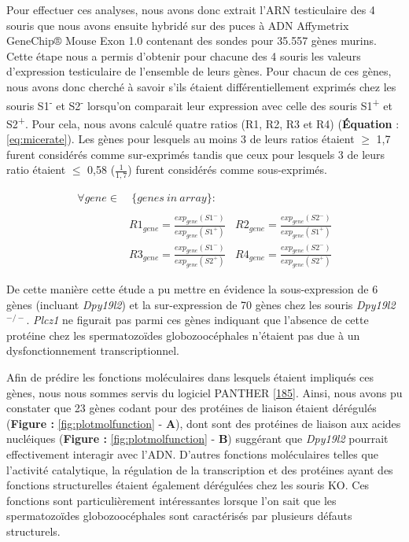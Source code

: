 \documentclass[12pt,a4paper,twoside]{ugathesis}
\theoremstyle{definition}
\theoremstyle{definition}
\theoremstyle{definition}
\theoremstyle{remark}
\begin{document}
Pour effectuer ces analyses, nous avons donc extrait l'ARN testiculaire
des 4 souris que nous avons ensuite hybridé sur des puces à ADN
Affymetrix GeneChip® Mouse Exon 1.0 contenant des sondes pour 35.557
gènes murins. Cette étape nous a permis d'obtenir pour chacune des 4
souris les valeurs d'expression testiculaire de l'ensemble de leurs
gènes. Pour chacun de ces gènes, nous avons donc cherché à savoir s'ils
étaient différentiellement exprimés chez les souris
S1\textsuperscript{-} et S2\textsuperscript{-} lorsqu'on comparait leur
expression avec celle des souris S1\textsuperscript{+} et
S2\textsuperscript{+}. Pour cela, nous avons calculé quatre ratios (R1,
R2, R3 et R4) (\textbf{Équation} : \eqref{eq:micerate}). Les gènes pour
lesquels au moins 3 de leurs ratios étaient \(\ge\) 1,7 furent
considérés comme sur-exprimés tandis que ceux pour lesquels 3 de leurs
ratio étaient \(\le\) 0,58 (\(\frac{1}{1,7}\)) furent considérés comme
sous-exprimés.

\begin{equation} 
\begin{split}
\forall gene \in & \ \{genes\ in\ array\}: \\
\\
& R1_{gene} = \frac{exp_{gene}(S1^-)}{exp_{gene}(S1^+)} \ \ \ \ R2_{gene} = \frac{exp_{gene}(S2^-)}{exp_{gene}(S1^+)} \\
& R3_{gene} = \frac{exp_{gene}(S1^-)}{exp_{gene}(S2^+)} \ \ \ \ R4_{gene} = \frac{exp_{gene}(S2^-)}{exp_{gene}(S2^+)} 
\label{eq:micerate}
\end{split}
\end{equation}

De cette manière cette étude a pu mettre en évidence la sous-expression
de 6 gènes (incluant \emph{Dpy19l2}) et la sur-expression de 70 gènes
chez les souris \emph{Dpy19l2}\(^{-/-}\). \emph{Plcz1} ne figurait pas
parmi ces gènes indiquant que l'absence de cette protéine chez les
spermatozoïdes globozoocéphales n'étaient pas due à un dysfonctionnement
transcriptionnel.

Afin de prédire les fonctions moléculaires dans lesquels étaient
impliqués ces gènes, nous nous sommes servis du logiciel PANTHER
{[}\protect\hyperlink{ref-Mi2017}{185}{]}. Ainsi, nous avons pu
constater que 23 gènes codant pour des protéines de liaison étaient
dérégulés (\textbf{Figure : }\ref{fig:plotmolfunction} - \textbf{A}),
dont sont des protéines de liaison aux acides nucléiques (\textbf{Figure
: }\ref{fig:plotmolfunction} - \textbf{B}) suggérant que \emph{Dpy19l2}
pourrait effectivement interagir avec l'ADN. D'autres fonctions
moléculaires telles que l'activité catalytique, la régulation de la
transcription et des protéines ayant des fonctions structurelles étaient
également dérégulées chez les souris KO. Ces fonctions sont
particulièrement intéressantes lorsque l'on sait que les spermatozoïdes
globozoocéphales sont caractérisés par plusieurs défauts structurels.
\end{document}
